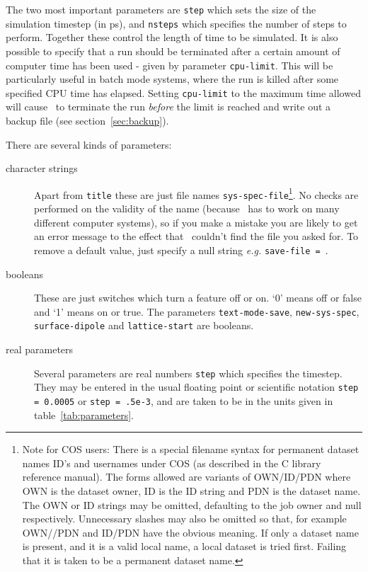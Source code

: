 The two most important parameters are \verb'step' which sets the size
of the simulation timestep (in ps), and \verb'nsteps' which specifies
the number of steps to perform.  Together these control the length of
time to be simulated.  It is also possible to specify that a run
should be terminated after a certain amount of computer time has been
used - given by parameter \verb'cpu-limit'.  This will be particularly
useful in batch mode systems, where the run is killed after some
specified CPU time has elapsed.  Setting \verb'cpu-limit' to the
maximum time allowed will cause \moldy\  to terminate the run {\em
before} the limit is reached and write out a backup file (see
section~\ref{sec:backup}).

There are several kinds of parameters:
\begin{description}

\item[character strings] Apart from \verb'title' these are just file
names \eg \verb'sys-spec-file'\footnote{Note for COS users: There is a
special filename syntax for permanent dataset names ID's and usernames
under COS (as described in the C library reference manual). The forms
allowed are variants of OWN/ID/PDN where OWN is the dataset owner, ID
is the ID string and PDN is the dataset name.  The OWN or ID strings
may be omitted, defaulting to the job owner and null respectively.
Unnecessary slashes may also be omitted so that, for example OWN//PDN
and ID/PDN have the obvious meaning. If only a dataset name is
present, and it is a valid local name, a local dataset is tried first.
Failing that it is taken to be a permanent dataset name.}.  No checks
are performed on the validity of the name (because \moldy\  has to work
on many different computer systems), so if you make a mistake you are
likely to get an error message to the effect that \moldy\  couldn't find
the file you asked for.  To remove a default value, just specify a
null string {\em e.g.} \verb'save-file = '.

\item[booleans] These are just switches which turn a feature off or
on. `0' means off or false and `1' means on or true. The parameters
\verb'text-mode-save', \verb'new-sys-spec', 
\verb'surface-dipole' and \verb'lattice-start' are booleans.

\item[real parameters] Several parameters are real numbers \eg
\verb'step' which specifies the timestep.  They may be entered in the
usual floating point or scientific notation \eg \mbox{\verb'step = 0.0005'}
or \mbox{\verb'step = .5e-3'}, and are taken to be in the units given in
table~\ref{tab:parameters}.


\end{description}
